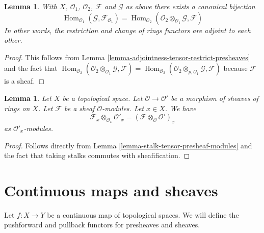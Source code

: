 \documentclass{stacks-project}
\theoremstyle{plain}
\newtheorem{lemma}[subsection]{Lemma}
\theoremstyle{definition}
\theoremstyle{remark}
\numberwithin{equation}{subsection}
\def\Hom{\mathop{\mathrm{Hom}}\nolimits}
\begin{document}
\begin{lemma}
\label{lemma-adjointness-tensor-restrict}
With $X$, $\mathcal{O}_1$, $\mathcal{O}_2$, $\mathcal{F}$ and
$\mathcal{G}$ as above there exists a canonical bijection
$$
\Hom_{\mathcal{O}_1}(\mathcal{G}, \mathcal{F}_{\mathcal{O}_1})
=
\Hom_{\mathcal{O}_2}(
\mathcal{O}_2 \otimes_{\mathcal{O}_1} \mathcal{G},
\mathcal{F}
)
$$
In other words, the restriction and change of rings functors
are adjoint to each other.
\end{lemma}

\begin{proof}
This follows from
Lemma \ref{lemma-adjointness-tensor-restrict-presheaves}
and the fact that
$\Hom_{\mathcal{O}_2}(
\mathcal{O}_2 \otimes_{\mathcal{O}_1} \mathcal{G},
\mathcal{F}
)
=
\Hom_{\mathcal{O}_2}(
\mathcal{O}_2 \otimes_{p, \mathcal{O}_1} \mathcal{G},
\mathcal{F}
)$
because $\mathcal{F}$ is a sheaf.
\end{proof}

\begin{lemma}
\label{lemma-stalk-tensor-sheaf-modules}
Let $X$ be a topological space.
Let $\mathcal{O} \to \mathcal{O}'$ be a morphism of
sheaves of rings on $X$.
Let $\mathcal{F}$ be a sheaf $\mathcal{O}$-modules.
Let $x \in X$. We have
$$
\mathcal{F}_x \otimes_{\mathcal{O}_x} \mathcal{O}'_x
=
(\mathcal{F} \otimes_\mathcal{O} \mathcal{O}')_x
$$
as $\mathcal{O}'_x$-modules.
\end{lemma}

\begin{proof}
Follows directly from Lemma \ref{lemma-stalk-tensor-presheaf-modules}
and the fact that taking stalks commutes with sheafification.
\end{proof}


















\section{Continuous maps and sheaves}
\label{section-presheaves-functorial}

\noindent
Let $f : X \to Y$ be a continuous map of topological spaces.
We will define the pushforward and pullback functors for
presheaves and sheaves.
\end{document}
